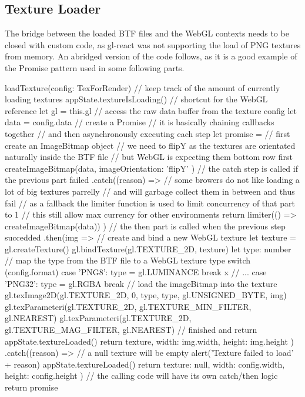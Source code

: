 \subsection{Texture Loader}\label{sec_textureloader}
The bridge between the loaded BTF files and the WebGL contexts needs to be
closed with custom code, as gl-react was not supporting the load of PNG textures
from memory. An abridged version of the code follows, as it is a good example of
the Promise pattern used in some following parts.
\begin{typescript}
loadTexture(config: TexForRender) {
    // keep track of the amount of currently loading textures
    appState.textureIsLoading()
    // shortcut for the WebGL reference
    let gl = this.gl
    // access the raw data buffer from the texture config
    let data = config.data
    // create a Promise
    // it is basically chaining callbacks together
    // and then asynchronously executing each step
    let promise =
        // first create an ImageBitmap object
        // we need to flipY as the textures are orientated naturally inside the BTF file
        // but WebGL is expecting them bottom row first
        createImageBitmap(data, { imageOrientation: 'flipY' })
        // the catch step is called if the previous part failed
        .catch((reason) => {
            // some browers do not like loading a lot of big textures parrelly
            // and will garbage collect them in between and thus fail
            // as a fallback the limiter function is used to limit concurrency of that part to 1
            // this still allow max currency for other environments
            return limiter(() => createImageBitmap(data))
        })
        // the then part is called when the previous step succedded
        .then(img => {
            // create and bind a new WebGL texture
            let texture = gl.createTexture()
            gl.bindTexture(gl.TEXTURE_2D, texture)
            let type: number
            // map the type from the BTF file to a WebGL texture type
            switch (config.format) {
                case 'PNG8':
                    type = gl.LUMINANCE
                    break
x                // ...
                case 'PNG32':
                    type = gl.RGBA
                    break
            }
            // load the imageBitmap into the texture
            gl.texImage2D(gl.TEXTURE_2D, 0, type, type, gl.UNSIGNED_BYTE, img)
            gl.texParameteri(gl.TEXTURE_2D, gl.TEXTURE_MIN_FILTER, gl.NEAREST)
            gl.texParameteri(gl.TEXTURE_2D, gl.TEXTURE_MAG_FILTER, gl.NEAREST)
            // finished and return
            appState.textureLoaded()
            return { texture, width: img.width, height: img.height }
        })
        .catch((reason) => {
            // a null texture will be empty
            alert('Texture failed to load' + reason)
            appState.textureLoaded()
            return { texture: null, width: config.width, height: config.height }
        })
   // the calling code will have its own catch/then logic
   return promise
}
\end{typescript}

